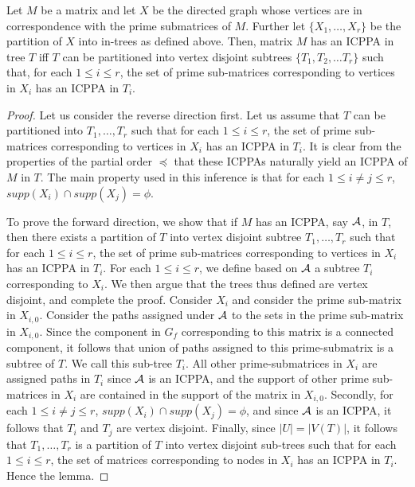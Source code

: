 \documentclass{llncs}
\def\cA{{\cal A}}
\begin{document}
\begin{lemma}
\label{lem:subicppa}
Let $M$ be a matrix and let $X$ be the directed graph whose vertices are in correspondence with the prime submatrices of $M$.  Further let $\{X_1,\ldots,X_r\}$ be the partition of $X$ into in-trees as defined above.
Then, matrix $M$ has an ICPPA in tree $T$ iff $T$ can be partitioned into vertex disjoint subtrees
 $\{T_1, T_2, \dots T_r\}$ such that, for each $1 \leq i \leq r$, the set of prime sub-matrices corresponding to vertices in $X_i$ has an ICPPA in $T_i$.
\end{lemma}
\begin{proof}
Let us consider the reverse direction first.  Let us assume that $T$ can be partitioned into $T_1, \ldots, T_r$ such
that for each $1 \leq i \leq r $, the set of prime sub-matrices corresponding to vertices in $X_i$ has an ICPPA in $T_i$.  It is clear from the properties of the partial order $\preccurlyeq$ that these ICPPAs naturally yield an ICPPA  of $M$ in $T$.  The main property used in this inference is that for each $1 \leq i \neq j \leq r$, $supp(X_i) \cap supp(X_j) = \phi$.  

\noindent
To prove the forward direction, we show that if $M$ has an ICPPA, say $\cA$, in $T$, then there exists
  a partition of $T$ into vertex disjoint subtree $T_1, \ldots, T_r$ such that for each $1 \leq i \leq r$, the set of prime sub-matrices corresponding to vertices in $X_i$ has an ICPPA in $T_i$.  For each $1 \leq i \leq r$, we define based on $\cA$ a subtree 
$T_i$ corresponding to $X_i$.  We then argue that the trees thus defined are vertex disjoint, and complete the proof.
 Consider $X_i$ and consider the prime sub-matrix in $X_{i,0}$.  Consider the paths assigned under $\cA$ to the sets in the prime sub-matrix in $X_{i,0}$.  Since the component in $G_f$ corresponding to this matrix is a connected component, it follows that union of paths assigned to this prime-submatrix is a subtree of $T$.  We call this sub-tree $T_i$.  All other prime-submatrices in $X_i$ are assigned paths in $T_i$ since $\cA$ is an ICPPA, and the support of other prime sub-matrices in $X_i$ are contained in the support of the matrix in $X_{i,0}$.  Secondly, for each $1 \leq i \neq j \leq r$, $supp(X_i) \cap supp(X_j) = \phi$, and since $\cA$ is an ICPPA, it follows that $T_i$ and $T_j$ are vertex disjoint.  Finally, since $|U| = |V(T)|$, it follows that $T_1, \ldots, T_r$ is a partition of $T$ into vertex disjoint sub-trees such that for each $1 \leq i \leq r$, the set of matrices corresponding to nodes in $X_i$ has an ICPPA in $T_i$.  Hence the lemma.
\end{proof}
\end{document}
